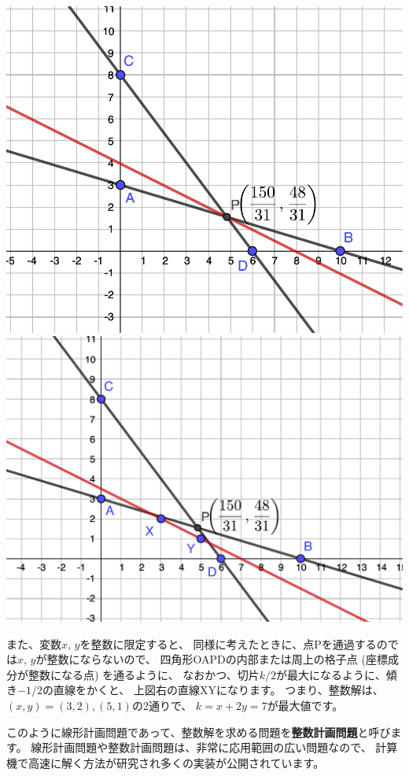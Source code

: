 \documentclass{jsarticle}
\begin{document}
\bigskip
\noindent
\hfil
\includegraphics[scale=0.65]{./fig/lpgraph2.pdf}
\hfil
\includegraphics[scale=0.65]{./fig/lpgraph3.pdf}
\hfil
\bigskip

また、変数$x$, $y$を整数に限定すると、
同様に考えたときに、点Pを通過するのでは$x$, $y$が整数にならないので、
四角形OAPDの内部または周上の格子点 (座標成分が整数になる点) を通るように、
なおかつ、切片$k/2$が最大になるように、傾き$-1/2$の直線をかくと、
上図右の直線XYになります。
つまり、整数解は、$(x,y) = (3,2), (5,1)$の2通りで、
$k = x+2y = 7$が最大値です。

このように線形計画問題であって、整数解を求める問題を{\bf 整数計画問題}と呼びます。
%
線形計画問題や整数計画問題は、非常に応用範囲の広い問題なので、
計算機で高速に解く方法が研究され多くの実装が公開されています。
\end{document}
